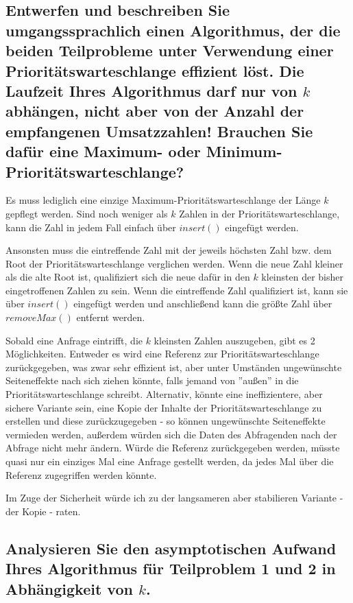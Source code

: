 \documentclass{article}
\begin{document}
\subsection{Entwerfen und beschreiben Sie umgangssprachlich einen Algorithmus, der die beiden
Teilprobleme unter Verwendung einer Prioritätswarteschlange effizient löst. Die Laufzeit Ihres
Algorithmus darf nur von $k$ abhängen, nicht aber von der Anzahl der empfangenen Umsatzzahlen!
Brauchen Sie dafür eine Maximum- oder Minimum-Prioritätswarteschlange?}

Es muss lediglich eine einzige Maximum-Prioritätswarteschlange der Länge $k$ gepflegt werden.
Sind noch weniger als $k$ Zahlen in der Prioritätswarteschlange, kann die Zahl in jedem Fall
einfach über $insert()$ eingefügt werden.

Ansonsten muss die eintreffende Zahl mit der jeweils höchsten Zahl bzw. dem Root der Prioritätswarteschlange
verglichen werden. Wenn die neue Zahl kleiner als die alte Root ist, qualifiziert sich die neue
dafür in den $k$ kleinsten der bisher eingetroffenen Zahlen zu sein. Wenn die eintreffende Zahl
qualifiziert ist, kann sie über $insert()$ eingefügt werden und anschließend kann die größte Zahl
über $removeMax()$ entfernt werden.

Sobald eine Anfrage eintrifft, die $k$ kleinsten Zahlen auszugeben, gibt es 2 Möglichkeiten.
Entweder es wird eine Referenz zur Prioritätswarteschlange zurückgegeben, was zwar sehr effizient
ist, aber unter Umständen ungewünschte Seiteneffekte nach sich ziehen könnte, falls jemand von
''außen'' in die Prioritätswarteschlange schreibt. Alternativ, könnte eine ineffizientere, aber
sichere Variante sein, eine Kopie der Inhalte der Prioritätswarteschlange zu erstellen und diese
zurückzugegeben - so können ungewünschte Seiteneffekte vermieden werden, außerdem würden sich die
Daten des Abfragenden nach der Abfrage nicht mehr ändern. Würde die Referenz zurückgegeben werden,
müsste quasi nur ein einziges Mal eine Anfrage gestellt werden, da jedes Mal über die Referenz
zugegriffen werden könnte.

Im Zuge der Sicherheit würde ich zu der langsameren aber stabilieren Variante - der Kopie - raten.

\subsection{Analysieren Sie den asymptotischen Aufwand Ihres Algorithmus für Teilproblem 1 und 2 in
Abhängigkeit von $k$.}
\end{document}
